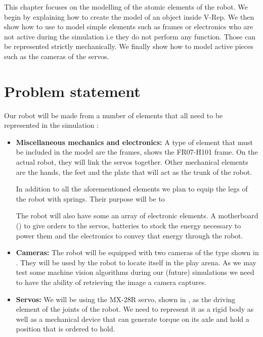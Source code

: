 This chapter focuses on the modelling of the atomic elements of the robot. We begin by explaining how to create the model of an object inside V-Rep. We then show how to use to model simple elements such as frames or electronics who are not active during the simulation i.e they do not perform any function. Those can be represented strictly mechanically. We finally show how to model active pieces such as the cameras of the servos.

\section{Problem statement}
Our robot will be made from a number of elements that all need to be represented in the simulation :\begin{itemize}
\item \textbf{Miscellaneous mechanics and electronics:} A type of element that must be included in the model are the frames,  shows the FR07-H101 frame. On the actual robot, they will link the servos together. Other mechanical elements are the hands, the feet and the plate that will act as the trunk of the robot. 

In addition to all the aforementioned elements we plan to equip the legs of the robot with springs. Their purpose will be to 

The robot will also have some an array of electronic elements. A motherboard () to give orders to the servos, batteries to stock the energy necessary to power them and the electronics to convey that energy through the robot.

\item \textbf{Cameras:} The robot will be equipped with two cameras of the type shown in . They will be used by the robot to locate itself in the play arena. As we may test some machine vision algorithms during our (future) simulations we need to have the ability of retrieving the image a camera captures.

\item \textbf{Servos:} We will be using the MX-28R servo, shown in , as the driving element of the joints of the robot. We need to represent it as a rigid body as well as a mechanical device that can generate torque on its axle and hold a position that is ordered to hold.
\end{itemize}

